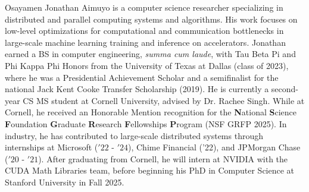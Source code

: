 \begin{biosketch}
Osayamen Jonathan Aimuyo is a computer science researcher specializing in distributed and parallel computing systems
and algorithms.
His work focuses on low-level optimizations for computational and communication bottlenecks in
large-scale machine learning training and inference on accelerators.
Jonathan earned a BS in computer engineering, \textit{summa cum laude}, with Tau Beta Pi and Phi Kappa Phi Honors from the
University of Texas at Dallas (class of 2023),
where he was a Presidential Achievement Scholar and a semifinalist
for the national Jack Kent Cooke Transfer Scholarship (2019).
He is currently a second-year CS MS student at Cornell University,
advised by Dr. Rachee Singh.
While at Cornell, he received an Honorable Mention recognition for the
\textbf{N}ational \textbf{S}cience \textbf{F}oundation \textbf{G}raduate \textbf{R}esearch \textbf{F}ellowships
\textbf{P}rogram (NSF GRFP 2025).
In industry, he has contributed to large-scale distributed systems through internships at
Microsoft (\('22\) - \('24\)), Chime Financial ('22), and JPMorgan Chase (\('20\) - \('21\)).
After graduating from Cornell, he will intern at NVIDIA with the CUDA Math Libraries team,
before beginning his PhD in Computer Science at Stanford University in Fall 2025.
\end{biosketch}